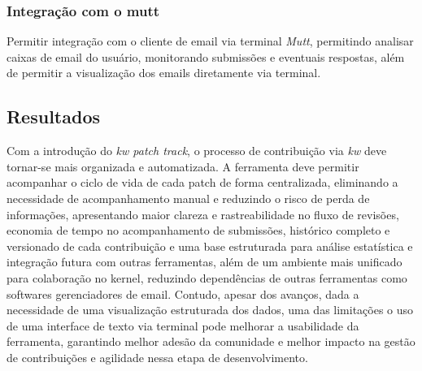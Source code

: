 \subsubsection{Integração com o mutt}
Permitir integração com o cliente de email via terminal \textit{Mutt}, permitindo analisar caixas de email do usuário, monitorando submissões e eventuais respostas, além de permitir a visualização dos emails diretamente via terminal. 
\subsection{Resultados}

Com a introdução do \textit{kw patch track}, o processo de contribuição via \textit{kw} deve tornar-se mais organizada e automatizada. A ferramenta deve permitir acompanhar o ciclo de vida de cada patch de forma centralizada, eliminando a necessidade de acompanhamento manual e reduzindo o risco de perda de informações, apresentando maior clareza e rastreabilidade no fluxo de revisões, economia de tempo no acompanhamento de submissões, histórico completo e versionado de cada contribuição e uma base estruturada para análise estatística e integração futura com outras ferramentas, além de um ambiente mais unificado para colaboração no kernel, reduzindo dependências de outras ferramentas como softwares gerenciadores de email. Contudo, apesar dos avanços, dada a necessidade de uma visualização estruturada dos dados, uma das limitações o uso de uma interface de texto via terminal pode melhorar a usabilidade da ferramenta, garantindo melhor adesão da comunidade e melhor impacto na gestão de contribuições e agilidade nessa etapa de desenvolvimento.